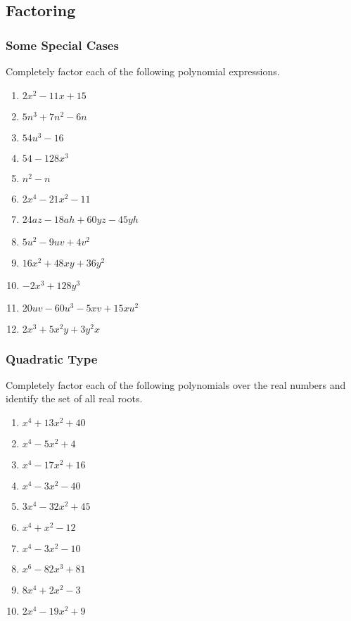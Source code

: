 \documentclass[12pt]{book}
\theoremstyle{definition}
\begin{document}
\subsection*{Factoring}
\subsubsection{Some Special Cases}
Completely factor each of the following polynomial expressions.
\begin{multicols}{2}
\begin{enumerate}
  \item $2 x^2 - 11 x + 15$
  \item $5 n^3 + 7 n^2 - 6 n$
  \item $54 u^3 - 16$
  \item $54 - 128 x^3$
  \item $n^2 - n$
  \item $2x^4 -21x^2-11$
  \item $24 a z - 18 a h + 60 y z - 45 y h$
  \item $5 u^2 - 9 u v + 4 v^2$
  \item $16 x^2 + 48 x y + 36 y^2$
  \item $- 2 x^3 + 128 y^3$
  \item $20 u v - 60 u^3 - 5 x v + 15 x u^2$
  \item $2 x^3 + 5 x^2 y + 3 y^2 x$
  \end{enumerate}
\end{multicols}
\subsubsection{Quadratic Type}
Completely factor each of the following polynomials over the real numbers and identify the set of all real roots.
\begin{multicols}{2}
\begin{enumerate}
  \item  $x^4 +13x^2+40$
  \item  $x^4-5x^2+4$
  \item  $x^4 -17x^2+16$
  \item  $x^4 -3x^2-40$
  \item  $3x^4 -32x^2+45$
  \item  $x^4 +x^2-12$
  \item  $x^4 -3x^2-10$
  \item  $x^6 -82x^3+81$
  \item  $8x^4 +2x^2-3$
  \item  $2x^4 -19x^2+9$
\end{enumerate}
\end{multicols}
\end{document}
